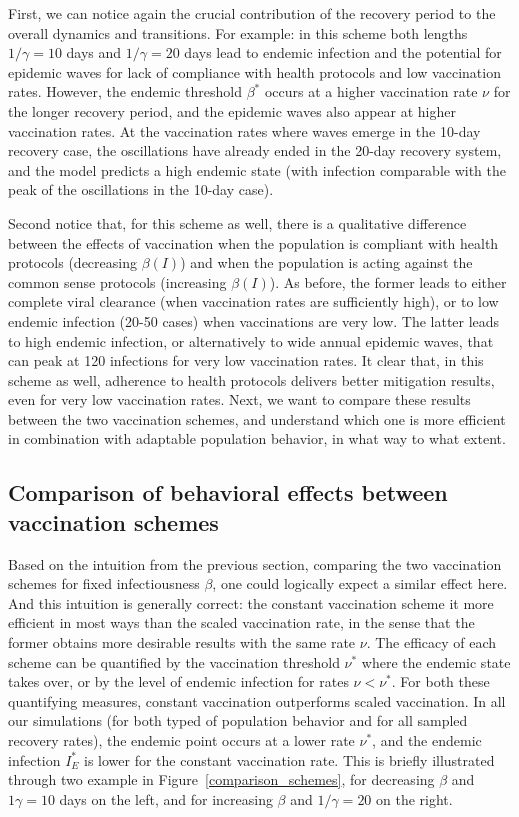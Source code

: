 \documentclass[10pt]{article}
\begin{document}
First, we can notice again the crucial contribution of the recovery period to the overall dynamics and transitions. For example: in this scheme both lengths $1/\gamma = 10$ days and $1/\gamma =20$ days lead to endemic infection and the potential for epidemic waves for lack of compliance with health protocols and low vaccination rates. However, the endemic threshold $\beta^*$ occurs at a higher vaccination rate $\nu$ for the longer recovery period,  and the epidemic waves also appear at higher vaccination rates. At the vaccination rates where waves emerge in the 10-day recovery case, the oscillations have already ended in the 20-day recovery system, and the model predicts a high endemic state (with infection comparable with the peak of the oscillations in the 10-day case).

Second notice that, for this scheme as well, there is a qualitative difference between the effects of vaccination when the population is compliant with health protocols (decreasing $\beta(I)$) and when the population is acting against the common sense protocols (increasing $\beta(I)$). As before, the former leads to either complete viral clearance (when vaccination rates are sufficiently high), or to low endemic infection (20-50 cases) when vaccinations are very low. The latter leads to high endemic infection, or alternatively to wide annual epidemic waves, that can peak at 120 infections for very low vaccination rates. It clear that, in this scheme as well, adherence to health protocols delivers better mitigation results, even for very low vaccination rates. Next, we want to compare these results between the two vaccination schemes, and understand which one is more efficient in combination with adaptable population behavior, in what way to what extent.


\subsection{Comparison of behavioral effects between vaccination schemes}
\quad

\vspace{2mm}
\noindent Based on the intuition from the previous section, comparing the two vaccination schemes for fixed infectiousness $\beta$, one could logically expect a similar effect here. And this intuition is generally correct: the constant vaccination scheme it more efficient in most ways than the scaled vaccination rate, in the sense that the former obtains more desirable results with the same rate $\nu$. The efficacy of each scheme can be quantified by the vaccination threshold $\nu^*$ where the endemic state takes over, or by the level of endemic infection for rates $\nu<\nu^*$. For both these quantifying measures, constant vaccination outperforms scaled vaccination. In all our simulations (for both typed of population behavior and for all sampled recovery rates), the endemic point occurs at a lower rate $\nu^*$, and the endemic infection $I_E^*$ is lower for the constant vaccination rate. This is briefly illustrated through two example in Figure~\ref{comparison_schemes}, for decreasing $\beta$ and $1\gamma=10$ days on the left, and for increasing $\beta$ and $1/\gamma=20$ on the right.
\end{document}
